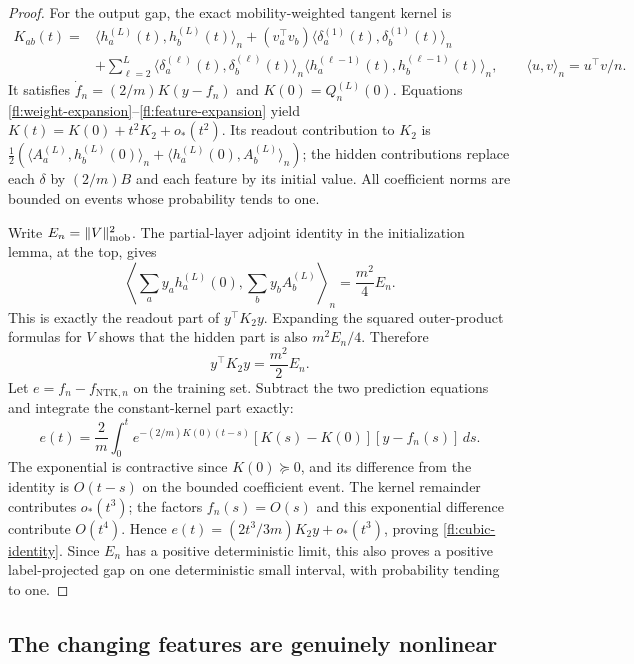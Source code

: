 \begin{proof}
For the output gap, the exact mobility-weighted tangent kernel is
\begin{align*}
 K_{ab}(t)={}&\langle h_a^{(L)}(t),h_b^{(L)}(t)\rangle_n
 +(v_a^\top v_b)\langle\delta_a^{(1)}(t),\delta_b^{(1)}(t)\rangle_n\\
 &+\sum_{\ell=2}^L
  \langle\delta_a^{(\ell)}(t),\delta_b^{(\ell)}(t)\rangle_n
  \langle h_a^{(\ell-1)}(t),h_b^{(\ell-1)}(t)\rangle_n,
 \qquad \langle u,v\rangle_n=u^\top v/n.
\end{align*}
It satisfies $\dot f_n=(2/m)K(y-f_n)$ and $K(0)=Q_n^{(L)}(0)$.
Equations \eqref{fl:weight-expansion}--\eqref{fl:feature-expansion} yield
$K(t)=K(0)+t^2K_2+o_*(t^2)$. Its readout contribution to $K_2$ is
$\tfrac12(\langle A_a^{(L)},h_b^{(L)}(0)\rangle_n+
\langle h_a^{(L)}(0),A_b^{(L)}\rangle_n)$; the hidden contributions
replace each $\delta$ by $(2/m)B$ and each feature by its initial value.
All coefficient norms are bounded on events whose probability tends to one.

Write $E_n=\|V\|_{\rm mob}^2$. The partial-layer adjoint identity in
the initialization lemma, at the top, gives
\[
 \left\langle\sum_a y_ah_a^{(L)}(0),\sum_b y_b A_b^{(L)}\right\rangle_n
   =\frac{m^2}{4}E_n.
\]
This is exactly the readout part of $y^\top K_2y$. Expanding the squared
outer-product formulas for $V$ shows that the hidden part is also
$m^2E_n/4$. Therefore
\begin{equation}
 y^\top K_2y=\frac{m^2}{2}E_n.
 \label{fl:positive-kernel}
\end{equation}
Let $e=f_n-f_{\mathrm{NTK},n}$ on the training set. Subtract the two
prediction equations and integrate the constant-kernel part exactly:
\[
 e(t)=\frac2m\int_0^t e^{-(2/m)K(0)(t-s)}
                  [K(s)-K(0)][y-f_n(s)]\,ds.
\]
The exponential is contractive since $K(0)\succeq0$, and its difference
from the identity is $O(t-s)$ on the bounded coefficient event.
The kernel remainder contributes $o_*(t^3)$; the factors $f_n(s)=O(s)$
and this exponential difference contribute $O(t^4)$. Hence
$e(t)=(2t^3/3m)K_2y+o_*(t^3)$, proving
\eqref{fl:cubic-identity}. Since $E_n$ has a positive deterministic limit,
this also proves a positive label-projected gap on one deterministic
small interval, with probability tending to one.
\end{proof}

\subsection{The changing features are genuinely nonlinear}

